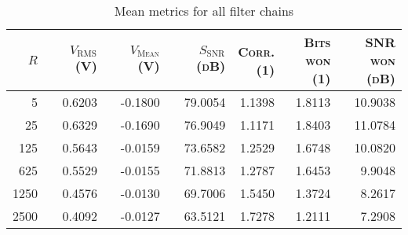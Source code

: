 \begin{table}
    \centering
    \caption[Mean Metrics for All Filter Chains]{Mean metrics for all filter chains}
    \label{tab:verification:results}
    \begin{tabular}{rrrrrrr}
        \toprule
        {\scshape $R$                 }& 
        {\scshape $V_\mathrm{RMS}$ (\si{V})  }& 
        {\scshape $V_\mathrm{Mean}$ (\si{V}) }& 
        {\scshape $S_\mathrm{SNR}$ (\si{dB}) }&  %
        {\parbox[t]{16mm}{\raggedleft\scshape Corr.\\(\si{1})}}& 
        {\parbox[t]{16mm}{\raggedleft\scshape Bits\\won (\si{1})}}& 
        {\parbox[t]{16mm}{\raggedleft\scshape SNR\\won (\si{dB})}}\\
        \midrule
        5           & 0.6203   & -0.1800   & 79.0054   & 1.1398   & 1.8113   & 10.9038\\
        25          & 0.6329   & -0.1690   & 76.9049   & 1.1171   & 1.8403   & 11.0784\\
        125         & 0.5643   & -0.0159   & 73.6582   & 1.2529   & 1.6748   & 10.0820\\
        625         & 0.5529   & -0.0155   & 71.8813   & 1.2787   & 1.6453   & 9.9048\\
        1250        & 0.4576   & -0.0130   & 69.7006   & 1.5450   & 1.3724   & 8.2617\\
        2500        & 0.4092   & -0.0127   & 63.5121   & 1.7278   & 1.2111   & 7.2908\\
        \bottomrule
    \end{tabular}
\end{table}


